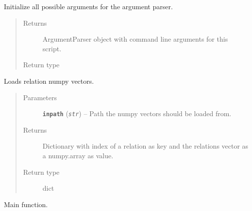 \documentclass[letterpaper,10pt,english]{sphinxmanual}
\begin{document}

\begin{fulllineitems}
\label{src.trans_e:src.trans_e.trans_we.init_argparser}
Initialize all possible arguments for the argument parser.
\begin{quote}\begin{description}
\item[{Returns}] \leavevmode
ArgumentParser object with command line arguments for this script.

\item[{Return type}] \leavevmode
{}

\end{description}\end{quote}

\end{fulllineitems}


\begin{fulllineitems}
\label{src.trans_e:src.trans_e.trans_we.load_relation_vectors}
Loads relation numpy vectors.
\begin{quote}\begin{description}
\item[{Parameters}] \leavevmode
\textbf{\texttt{inpath}} (\emph{\texttt{str}}) -- Path the numpy vectors should be loaded from.

\item[{Returns}] \leavevmode
Dictionary with index of a relation as key and the relations vector as a numpy.array as value.

\item[{Return type}] \leavevmode
dict

\end{description}\end{quote}

\end{fulllineitems}


\begin{fulllineitems}
\label{src.trans_e:src.trans_e.trans_we.main}
Main function.

\end{fulllineitems}
\end{document}
